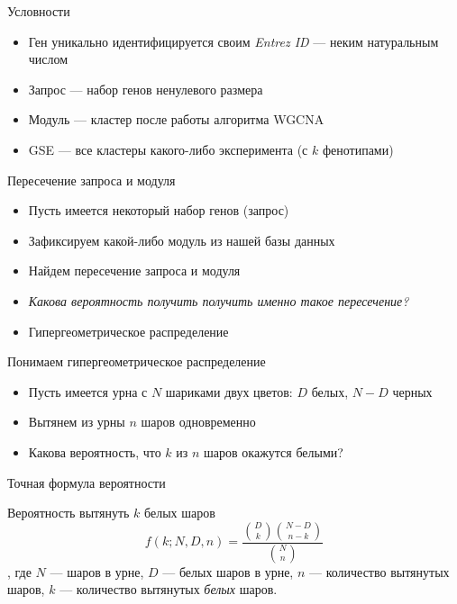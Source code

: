 \documentclass[10pt,pdf,utf8,russian,aspectratio=169]{beamer}
\begin{document}
\begin{frame}{Условности}
  \begin{itemize}[<+->]
    \item Ген уникально идентифицируется своим \emph{Entrez ID} --- неким натуральным числом
    \item Запрос --- набор генов ненулевого размера
    \item Модуль --- кластер после работы алгоритма WGCNA
    \item GSE --- все кластеры какого-либо эксперимента (с $k$ фенотипами)
  \end{itemize}
\end{frame}

\begin{frame}{Пересечение запроса и модуля}
  \begin{itemize}[<+->]
    \item Пусть имеется некоторый набор генов (запрос)
    \item Зафиксируем какой-либо модуль из нашей базы данных
    \item Найдем пересечение запроса и модуля
    \item \emph{Какова вероятность получить получить именно такое пересечение?}
    \item Гипергеометрическое распределение
  \end{itemize}
\end{frame}

\begin{frame}{Понимаем гипергеометрическое распределение}
  \begin{itemize}[<+->]
    \item Пусть имеется урна с $N$ шариками двух цветов: $D$ белых, $N - D$ черных
    \item Вытянем из урны $n$ шаров одновременно
    \item Какова вероятность, что $k$ из $n$ шаров окажутся белыми?
  \end{itemize}
\end{frame}

\begin{frame}{Точная формула вероятности}
    \begin{block}{Вероятность вытянуть $k$ белых шаров}
        \begin{equation}
        f(k; N, D, n) = \frac{\binom{D}{k}\binom{N - D}{n - k}}{\binom{N}{n}}
        \end{equation},
        где $N$ --- шаров в урне,
            $D$ --- белых шаров в урне,
            $n$ --- количество вытянутых шаров,
            $k$ --- количество вытянутых \emph{белых} шаров.
    \end{block}
\end{frame}
\end{document}

